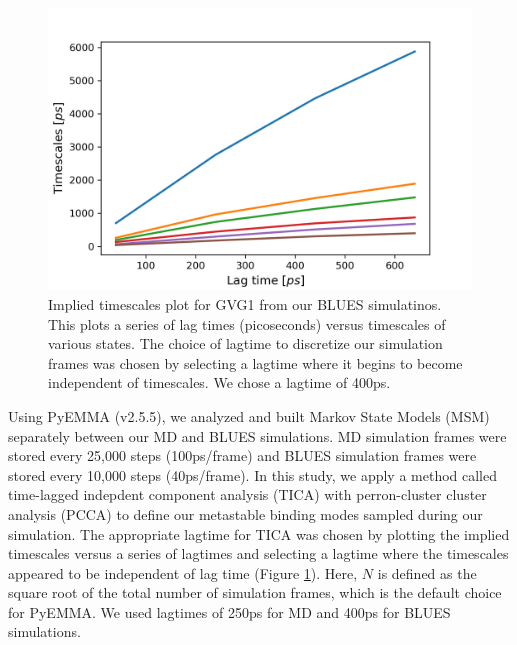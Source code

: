 \begin{figure}
    \centering
    \includegraphics[width=\linewidth]{chapter6/Figures/GVG_1-right_imptimescales.png}
    \caption[Implied Timescales for GVG1]{Implied timescales plot for GVG1 from our BLUES simulatinos. This plots a series of lag times (picoseconds) versus timescales of various states. The choice of lagtime to discretize our simulation frames was chosen by selecting a lagtime where it begins to become independent of timescales. We chose a lagtime of 400ps.}
    \label{fig:GVG_1-right-imptimescales}
\end{figure}

Using PyEMMA (v2.5.5), we analyzed and built Markov State Models (MSM) separately between our MD and BLUES simulations.
MD simulation frames were stored every 25,000 steps (100ps/frame) and BLUES simulation frames were stored every 10,000 steps (40ps/frame).
In this study, we apply a method called time-lagged indepdent component analysis (TICA) with perron-cluster cluster analysis (PCCA) to define our metastable binding modes sampled during our simulation.
The appropriate lagtime for TICA was chosen by plotting the implied timescales versus a series of lagtimes and selecting a lagtime where the timescales appeared to be independent of lag time (Figure \ref{fig:GVG_1-right-imptimescales}).
Here, $N$ is defined as the square root of the total number of simulation frames, which is the default choice for PyEMMA.
We used lagtimes of 250ps for MD and 400ps for BLUES simulations.


